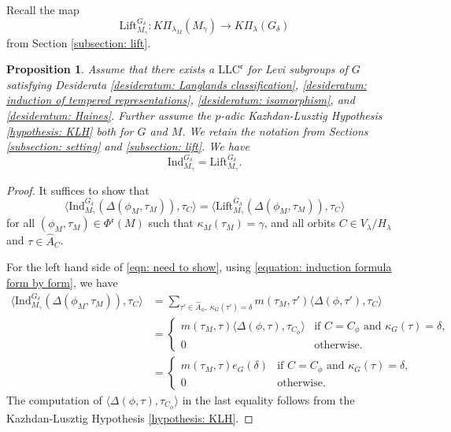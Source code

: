 \documentclass[11pt,letterpaper]{amsart}
\newcommand{\irrepdual}[1]{\widehat{#1}}
\newcommand{\mfr}[1]{\mathfrak{#1}}
\newcommand{\Ind}{\mathrm{Ind}}
\newcommand{\LLC}{\mathrm{LLC}}
\newcommand{\Lift}{\mathrm{Lift}}
\newcommand{\stsh}[2]{{#1}_{#2}}
\newtheorem{prop}[thm]{Proposition}
\renewcommand{\1}{\mathbbm{1}}
\numberwithin{equation}{section}
\begin{document}
{Recall the map \[\Lift_{M_\gamma}^{G_\delta}: K\Pi_{\lambda_M}(M_\gamma)\to K\Pi_\lambda(G_\delta)\] from Section \ref{subsection: lift}.
\begin{prop}\label{lemma: lift is induction}
    Assume that there exists a $\LLC^{\mathfrak{e}}$ for Levi subgroups of $G$ satisfying Desiderata \ref{desideratum: Langlands classification}, \ref{desideratum: induction of tempered representations}, \ref{desideratum: isomorphism}, and \ref{desideratum: Haines}. Further assume the $p$-adic Kazhdan-Lusztig Hypothesis \ref{hypothesis: KLH} both for $G$ and $M$. We retain the notation from Sections \ref{subsection: setting} and \ref{subsection: lift}. We have
    \[ \Ind_{M_\gamma}^{G_\delta} = \Lift_{M_\gamma}^{G_\delta}.\]
\end{prop}
\begin{proof}
    It suffices to show that 
    \begin{equation}\label{eqn: need to show}
        \langle \Ind_{M_\gamma}^{G_\delta}(\Delta(\phi_M, \tau_M)), \stsh{\tau}{C} \rangle = \langle \Lift_{M_\gamma}^{G_\delta}(\Delta(\phi_M, \tau_M)), \stsh{\tau}{C}\rangle
    \end{equation}
    for all $ (\phi_M,\tau_M) \in \Phi^{\mfr{e}}(M)$ such that $\kappa_M(\tau_M)=\gamma$, and all orbits $C \in V_{\lambda}/H_{\lambda}$ and $\tau \in \irrepdual{A}_{C}$.
    
    
    For the left hand side of \eqref{eqn: need to show}, using  \eqref{equation: induction formula form by form}, we have 
    \begin{align*}
        \langle \Ind_{M_\gamma}^{G_\delta}(\Delta(\phi_M, \tau_M)),\stsh{\tau}{C} \rangle &= \sum_{\tau' \in \irrepdual{A}_\phi,~\kappa_G(\tau')=\delta} m(\tau_M,\tau')\langle \Delta(\phi, \tau'), \stsh{\tau}{C} \rangle \\
        &= \begin{cases}
            m(\tau_M,\tau)\langle \Delta(\phi, {\tau}), \stsh{\tau}{C_\phi} \rangle  & \text{if } C=C_\phi \text{ and } \kappa_G(\tau)=\delta,\\
            0 & \text{otherwise}.
        \end{cases}\\
        &= \begin{cases}
            m(\tau_M,\tau)e_G(\delta)  & \text{if } C=C_\phi \text{ and } \kappa_G(\tau)=\delta,\\
            0 & \text{otherwise}.
        \end{cases}
    \end{align*}
The computation of $\langle \Delta(\phi, {\tau}), \stsh{\tau}{C_\phi} \rangle$ in {the} last equality follows from the Kazhdan-Lusztig Hypothesis \ref{hypothesis: KLH}. 


\end{proof}}
\end{document}
